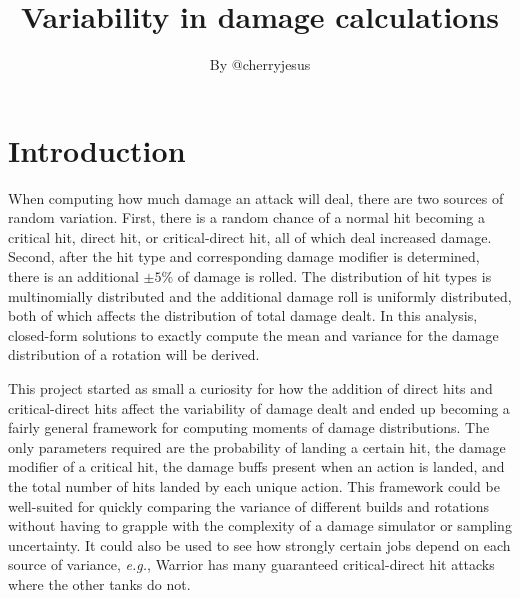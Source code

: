 \documentclass{article}
\begin{document}
    \title{Variability in damage calculations}
    \author{By @cherryjesus}
    \date{}
    \maketitle

    \section{Introduction}
    When computing how much damage an attack will deal, there are two sources of random variation. First, there is a random chance of a normal hit becoming a critical hit, direct hit, or critical-direct hit, all of which deal increased damage. Second, after the hit type and corresponding damage modifier is determined, there is an additional $\pm 5\%$ of damage is rolled. The distribution of hit types is multinomially distributed and the additional damage roll is uniformly distributed, both of which affects the distribution of total damage dealt. In this analysis, closed-form solutions to exactly compute the mean and variance for the damage distribution of a rotation will be derived.
    
    This project started as small a curiosity for how the addition of direct hits and critical-direct hits affect the variability of damage dealt and ended up becoming a fairly general framework for computing moments of damage distributions. The only parameters required are the probability of landing a certain hit, the damage modifier of a critical hit, the damage buffs present when an action is landed, and the total number of hits landed by each unique action. This framework could be well-suited for quickly comparing the variance of different builds and rotations without having to grapple with the complexity of a damage simulator or sampling uncertainty. It could also be used to see how strongly certain jobs depend on each source of variance, \textit{e.g.}, Warrior has many guaranteed critical-direct hit attacks where the other tanks do not.
\end{document}
